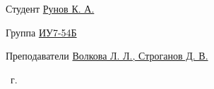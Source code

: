 \begin{titlepage}
\begin{center}
        \fontsize{14pt}{14pt}\selectfont


        \begin{flushleft}
            {Студент \uline{Рунов К. А.\hfill}}

            \vspace{0.5cm}

            {Группа \uline{ИУ7-54Б \hfill}}

            \vspace{0.5cm}



            {Преподаватели \uline{Волкова Л. Л., Строганов Д. В.\hfill}}



            \vspace{0.5cm}

        \end{flushleft}

        \vfill

        \the\year\ г.

    \end{center}
\end{titlepage}

